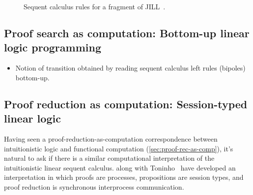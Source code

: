 \begin{figure}
  \caption{Sequent calculus rules for a fragment of \acl{JILL}~\autocite{Chang+:CMU03}.\label{fig:seq-jill}}
\end{figure}

\subsection{Proof search as computation: Bottom-up linear logic programming}\label{sec:linear-lp}

\begin{itemize}
\item Notion of transition obtained by reading sequent calculus left rules  (bipoles) bottom-up.
\end{itemize}

\subsection{Proof reduction as computation: Session-typed linear logic}\label{sec:async-sill}

Having seen a proof-reduction-as-computation correspondence between intuitionistic logic and functional computation (\cref{sec:proof-rec-as-comp}), it's natural to ask if there is a similar computational interpretation of the intuitionistic linear sequent calculus.
\Textcite{Caires+Pfenning:CONCUR10} along with Toninho~\autocite*{Caires+:TLDI12} have developed
an interpretation
in which proofs are processes, propositions are session types, and proof reduction is synchronous interprocess communication.

